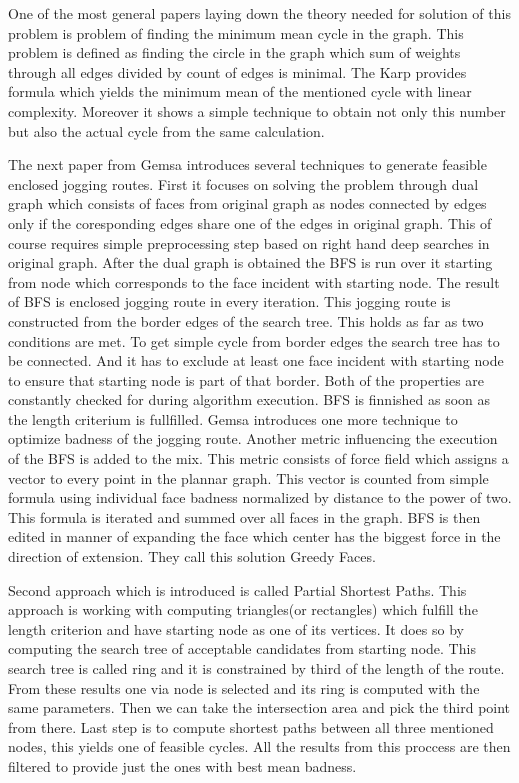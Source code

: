 \documentclass{ctuthesis}
\begin{document}
One of the most general papers laying down the theory needed for solution of this problem is problem of finding the minimum mean cycle in the graph. \cite{karp} This problem is defined as finding the circle in the graph which sum of weights through all edges divided by count of edges is minimal. The Karp provides formula which yields the minimum mean of the mentioned cycle with linear complexity. Moreover it shows a simple technique to obtain not only this number but also the actual cycle from the same calculation. \par
The next paper from Gemsa \cite{jogging} introduces several techniques to generate feasible enclosed jogging routes. First it focuses on solving the problem through dual graph which consists of faces from original graph as nodes connected by edges only if the coresponding edges share one of the edges in original graph. This of course requires simple preprocessing step based on right hand deep searches in original graph. After the dual graph is obtained the BFS is run over it starting from node which corresponds to the face incident with starting node. The result of BFS is enclosed jogging route in every iteration. This jogging route is constructed from the border edges of the search tree. This holds as far as two conditions are met. To get simple cycle from border edges the search tree has to be connected. And it has to exclude at least one face incident with starting node to ensure that starting node is part of that border. Both of the properties are constantly checked for during algorithm execution. BFS is finnished as soon as the length criterium is fullfilled. Gemsa introduces one more technique to optimize badness of the jogging route. Another metric influencing the execution of the BFS is added to the mix. This metric consists of force field which assigns a vector to every point in the plannar graph. This vector is counted from simple formula using individual face badness normalized by distance to the power of two. This formula is iterated and summed over all faces in the graph. BFS is then edited in manner of expanding the face which center has the biggest force in the direction of extension. They call this solution Greedy Faces.\par
Second approach which is introduced is called Partial Shortest Paths. This approach is working with computing triangles(or rectangles) which fulfill the length criterion and have starting node as one of its vertices. It does so by computing the search tree of acceptable candidates from starting node. This search tree is called ring and it is constrained by third of the length of the route. From these results one via node is selected and its ring is computed with the same parameters. Then we can take the intersection area and pick the third point from there. Last step is to compute shortest paths between all three mentioned nodes, this yields one of feasible cycles. All the results from this proccess are then filtered to provide just the ones with best mean badness. \par
\end{document}
